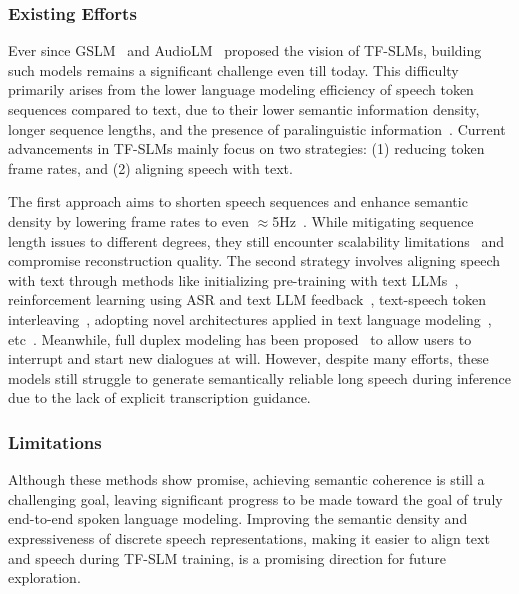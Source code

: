 \subsubsection{Existing Efforts}
Ever since GSLM~\cite{lakhotia2021generative} and AudioLM~\cite{borsos2023audiolm} proposed the vision of TF-SLMs, building such models remains a significant challenge even till today. 
This difficulty primarily arises from the lower language modeling efficiency of speech token sequences compared to text, due to their lower semantic information density, longer sequence lengths, and the presence of paralinguistic information~\cite{wang2024whyspeech}. 
Current advancements in TF-SLMs mainly focus on two strategies: (1) reducing token frame rates, and (2) aligning speech with text.

The first approach aims to shorten speech sequences and enhance semantic density by lowering frame rates \cite{lakhotia2021generative, hassid2024textually,shen2024acoustic} to even $\approx$5Hz~\cite{baade2024syllablelm, cho2024sylber}. 
While mitigating sequence length issues to different degrees, they still encounter scalability limitations~\cite{cuervo-marxer-2024-scaling} and compromise reconstruction quality. 
The second strategy involves aligning speech with text through methods like initializing pre-training with text LLMs~\cite{hassid2024textually},  reinforcement learning using ASR and text LLM feedback~\cite{lin2024align}, text-speech token interleaving~\cite{nguyen2024spirit}, adopting novel architectures applied in text language modeling~\cite{park2024longform}, etc~\cite{veluri2024beyond, zhang2024intrinsicvoice}. 
Meanwhile, full duplex modeling has been proposed~\cite{ma2024language} to allow users to interrupt and start new dialogues at will.
However, despite many efforts, these models still struggle to generate semantically reliable long speech during inference due to the lack of explicit transcription guidance.

\subsubsection{Limitations} 
Although these methods show promise, achieving semantic coherence is still a challenging goal, leaving significant progress to be made toward the goal of truly end-to-end spoken language modeling. 
Improving the semantic density and expressiveness of discrete speech representations, making it easier to align text and speech during TF-SLM training, is a promising direction for future exploration.


